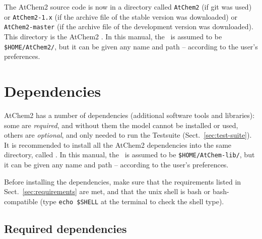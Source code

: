 The AtChem2 source code is now in a directory called \texttt{AtChem2}
(if git was used) or \texttt{AtChem2-1.x} (if the archive file of the
stable version was downloaded) or \texttt{AtChem2-master} (if the
archive file of the development version was downloaded). This
directory is the AtChem2 \maindir. In this manual, the \maindir\ is
assumed to be \texttt{\$HOME/AtChem2/}, but it can be given any name
and path -- according to the user's preferences.

\section{Dependencies} \label{sec:dependencies}

AtChem2 has a number of dependencies (additional software tools and
libraries): some are \emph{required}, and without them the model
cannot be installed or used, others are \emph{optional}, and only
needed to run the Testsuite (Sect.~\ref{sec:test-suite}).  It is
recommended to install all the AtChem2 dependencies into the same
directory, called \depdir. In this manual, the \depdir\ is assumed to
be \texttt{\$HOME/AtChem-lib/}, but it can be given any name and path
-- according to the user's preferences.

Before installing the dependencies, make sure that the requirements
listed in Sect.~\ref{sec:requirements} are met, and that the unix
shell is bash or bash-compatible (type \verb|echo $SHELL| at the
terminal to check the shell type).

\subsection{Required dependencies} \label{subsec:required-dependencies}



